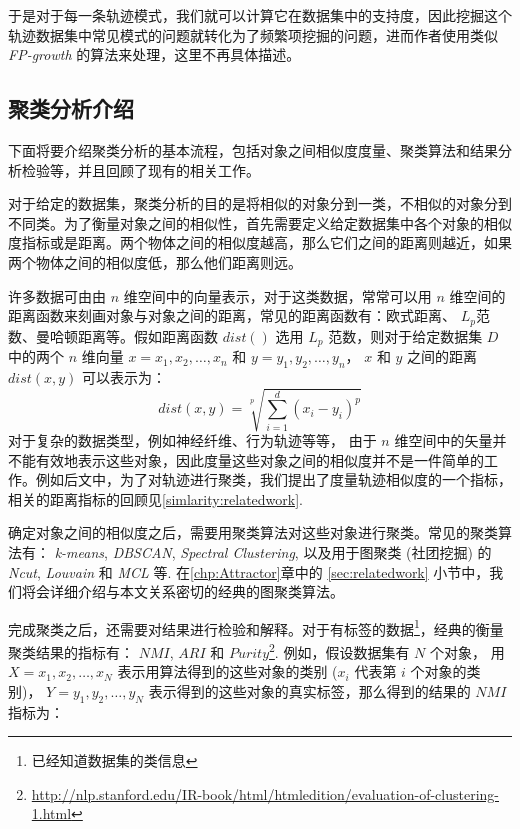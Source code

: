 

于是对于每一条轨迹模式，我们就可以计算它在数据集中的支持度，因此挖掘这个轨迹数据集中常见模式的问题就转化为了频繁项挖掘的问题，进而作者使用类似 \emph{FP-growth} 的算法来处理，这里不再具体描述。



\subsection{聚类分析介绍}
下面将要介绍聚类分析的基本流程，包括对象之间相似度度量、聚类算法和结果分析检验等，并且回顾了现有的相关工作。\par
\vspace{2mm}
对于给定的数据集，聚类分析的目的是将相似的对象分到一类，不相似的对象分到不同类。为了衡量对象之间的相似性，首先需要定义给定数据集中各个对象的相似度指标或是距离。两个物体之间的相似度越高，那么它们之间的距离则越近，如果两个物体之间的相似度低，那么他们距离则远。\par
许多数据可由由 $n$ 维空间中的向量表示，对于这类数据，常常可以用 $n$ 维空间的距离函数来刻画对象与对象之间的距离，常见的距离函数有：欧式距离、 $L_p$范数、曼哈顿距离等。假如距离函数 $dist()$ 选用 $L_p$ 范数，则对于给定数据集 $D$ 中的两个 $n$ 维向量 $x={x_1,x_2,\ldots,x_n}$ 和 $y={y_1,y_2,\ldots,y_n}$， $x$ 和 $y$ 之间的距离 $dist(x,y)$ 可以表示为：
\begin{equation}
dist(x,y) = \sqrt[p]{\sum_{i=1}^d {(x_i-y_i)^p}}
\end{equation}
对于复杂的数据类型，例如神经纤维、行为轨迹等等， 由于 $n$ 维空间中的矢量并不能有效地表示这些对象，因此度量这些对象之间的相似度并不是一件简单的工作。例如后文中，为了对轨迹进行聚类，我们提出了度量轨迹相似度的一个指标，相关的距离指标的回顾见\ref{simlarity:relatedwork}. \par

\vspace{2mm}
确定对象之间的相似度之后，需要用聚类算法对这些对象进行聚类。常见的聚类算法有： \emph{k-means}, \emph{DBSCAN}, \emph{Spectral Clustering}, 以及用于图聚类 (社团挖掘) 的 \emph{Ncut}, \emph{Louvain} 和 \emph{MCL} 等. 在\ref{chp:Attractor}章中的 \ref{sec:relatedwork} 小节中，我们将会详细介绍与本文关系密切的经典的图聚类算法。\par
\vspace{2mm}
完成聚类之后，还需要对结果进行检验和解释。对于有标签的数据\footnote{已经知道数据集的类信息}，经典的衡量聚类结果的指标有： $NMI$, $ARI$ 和 $Purity$\footnote{\url{http://nlp.stanford.edu/IR-book/html/htmledition/evaluation-of-clustering-1.html}}. 例如，假设数据集有 $N$ 个对象， 用 $X={x_1,x_2,\ldots,x_N}$ 表示用算法得到的这些对象的类别 ($x_i$ 代表第 $i$ 个对象的类别)， $Y={y_1,y_2,\ldots,y_N}$ 表示得到的这些对象的真实标签，那么得到的结果的 $NMI$ 指标为：


